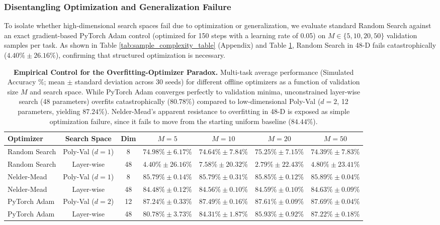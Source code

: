 \subsubsection{Disentangling Optimization and Generalization Failure}
To isolate whether high-dimensional search spaces fail due to optimization or generalization, we evaluate standard Random Search against an exact gradient-based PyTorch Adam control (optimized for 150 steps with a learning rate of 0.05) on $M \in \{5, 10, 20, 50\}$ validation samples per task. As shown in Table \ref{tab:sample_complexity_table} (Appendix) and Table \ref{tab:empirical_control}, Random Search in 48-D fails catastrophically ($4.40\% \pm 26.16\%$), confirming that structured optimization is necessary.

\begin{table}[t]
\caption{\textbf{Empirical Control for the Overfitting-Optimizer Paradox.} Multi-task average performance (Simulated Accuracy \%; mean $\pm$ standard deviation across 30 seeds) for different offline optimizers as a function of validation size $M$ and search space. While PyTorch Adam converges perfectly to validation minima, unconstrained layer-wise search (48 parameters) overfits catastrophically ($80.78\%$) compared to low-dimensional Poly-Val ($d=2$, 12 parameters, yielding $87.24\%$). Nelder-Mead's apparent resistance to overfitting in 48-D is exposed as simple optimization failure, since it fails to move from the starting uniform baseline ($84.44\%$).}
\label{tab:empirical_control}
\vskip 0.15in
\begin{center}
\begin{small}
\begin{sc}
\setlength{\tabcolsep}{3.5pt}
\begin{tabular}{lcccccc}
\toprule
Optimizer & Search Space & Dim & $M=5$ & $M=10$ & $M=20$ & $M=50$ \\
\midrule
Random Search & Poly-Val ($d=1$) & 8 & $74.98\% \pm 6.17\%$ & $74.64\% \pm 7.84\%$ & $75.25\% \pm 7.15\%$ & $74.39\% \pm 7.83\%$ \\
Random Search & Layer-wise & 48 & $4.40\% \pm 26.16\%$ & $7.58\% \pm 20.32\%$ & $2.79\% \pm 22.43\%$ & $4.80\% \pm 23.41\%$ \\
\midrule
Nelder-Mead & Poly-Val ($d=1$) & 8 & $85.79\% \pm 0.14\%$ & $85.79\% \pm 0.31\%$ & $85.85\% \pm 0.12\%$ & $85.89\% \pm 0.04\%$ \\
Nelder-Mead & Layer-wise & 48 & $84.48\% \pm 0.12\%$ & $84.56\% \pm 0.10\%$ & $84.59\% \pm 0.10\%$ & $84.63\% \pm 0.09\%$ \\
\midrule
PyTorch Adam & Poly-Val ($d=2$) & 12 & $\mathbf{87.24\% \pm 0.33\%}$ & $\mathbf{87.49\% \pm 0.16\%}$ & $\mathbf{87.61\% \pm 0.09\%}$ & $\mathbf{87.69\% \pm 0.04\%}$ \\
PyTorch Adam & Layer-wise & 48 & $80.78\% \pm 3.73\%$ & $84.31\% \pm 1.87\%$ & $85.93\% \pm 0.92\%$ & $87.22\% \pm 0.18\%$ \\
\bottomrule
\end{tabular}
\end{sc}
\end{small}
\end{center}
\vskip -0.1in
\end{table}

